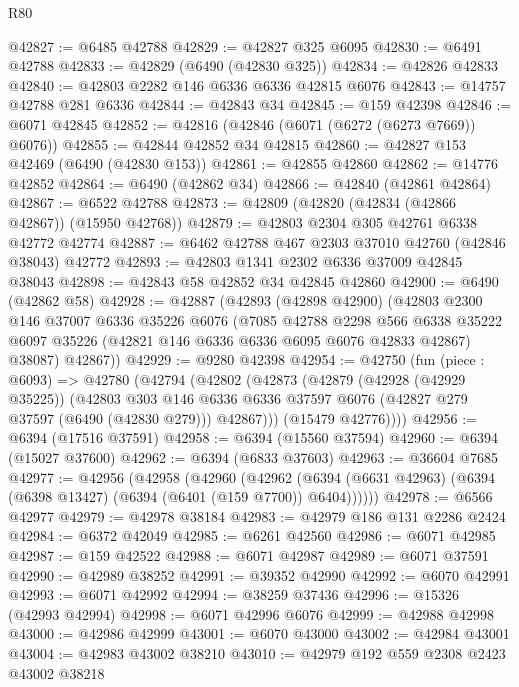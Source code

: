 \begin{lexlean}{R80}
\begin{coremodule}
@42827 := @6485 @42788
@42829 := @42827 @325 @6095
@42830 := @6491 @42788
@42833 := @42829 (@6490 (@42830 @325))
@42834 := @42826 @42833
@42840 := @42803 @2282 @146 @6336 @6336 @42815 @6076
@42843 := @14757 @42788 @281 @6336
@42844 := @42843 @34
@42845 := @159 @42398
@42846 := @6071 @42845
@42852 := @42816 (@42846 (@6071 (@6272 (@6273 @7669)) @6076))
@42855 := @42844 @42852 @34 @42815
@42860 := @42827 @153 @42469 (@6490 (@42830 @153))
@42861 := @42855 @42860
@42862 := @14776 @42852
@42864 := @6490 (@42862 @34)
@42866 := @42840 (@42861 @42864)
@42867 := @6522 @42788
@42873 := @42809 (@42820 (@42834 (@42866 @42867)) (@15950 @42768))
@42879 := @42803 @2304 @305 @42761 @6338 @42772 @42774
@42887 := @6462 @42788 @467 @2303 @37010 @42760 (@42846 @38043) @42772
@42893 := @42803 @1341 @2302 @6336 @37009 @42845 @38043
@42898 := @42843 @58 @42852 @34 @42845 @42860
@42900 := @6490 (@42862 @58)
@42928 := @42887
    (@42893
      (@42898 @42900)
      (@42803
        @2300
        @146
        @37007
        @6336
        @35226
        @6076
        (@7085
          @42788
          @2298
          @566
          @6338
          @35222
          @6097
          @35226
          (@42821 @146 @6336 @6336 @6095 @6076 @42833 @42867)
          @38087)
        @42867))
@42929 := @9280 @42398
@42954 := @42750
    (fun (piece : @6093) =>
    @42780
      (@42794
        (@42802
          (@42873
            (@42879
              (@42928 (@42929 @35225))
              (@42803
                @303
                @146
                @6336
                @6336
                @37597
                @6076
                (@42827 @279 @37597 (@6490 (@42830 @279)))
                @42867)))
          (@15479 @42776))))
@42956 := @6394 (@17516 @37591)
@42958 := @6394 (@15560 @37594)
@42960 := @6394 (@15027 @37600)
@42962 := @6394 (@6833 @37603)
@42963 := @36604 @7685
@42977 := @42956
    (@42958
      (@42960
        (@42962 (@6394 (@6631 @42963) (@6394 (@6398 @13427) (@6394 (@6401 (@159 @7700)) @6404))))))
@42978 := @6566 @42977
@42979 := @42978 @38184
@42983 := @42979 @186 @131 @2286 @2424
@42984 := @6372 @42049
@42985 := @6261 @42560
@42986 := @6071 @42985
@42987 := @159 @42522
@42988 := @6071 @42987
@42989 := @6071 @37591
@42990 := @42989 @38252
@42991 := @39352 @42990
@42992 := @6070 @42991
@42993 := @6071 @42992
@42994 := @38259 @37436
@42996 := @15326 (@42993 @42994)
@42998 := @6071 @42996 @6076
@42999 := @42988 @42998
@43000 := @42986 @42999
@43001 := @6070 @43000
@43002 := @42984 @43001
@43004 := @42983 @43002 @38210
@43010 := @42979 @192 @559 @2308 @2423 @43002 @38218

\end{coremodule}
\end{lexlean}
